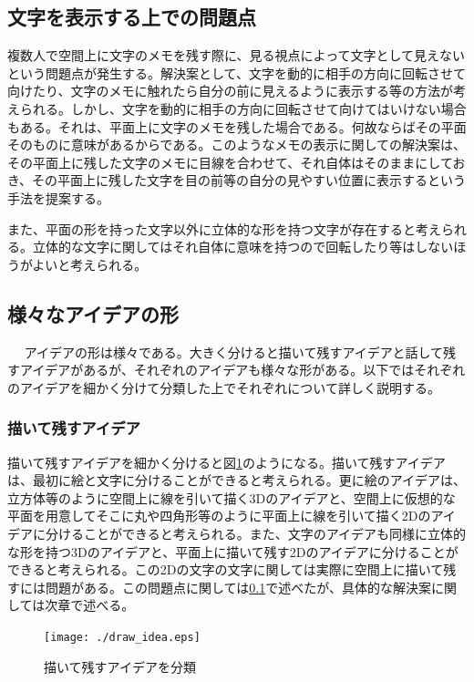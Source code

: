 \documentclass[11pt,a4j, titlepage]{jarticle} %
\begin{document}
\subsection{文字を表示する上での問題点} \label{moji_mondai}
複数人で空間上に文字のメモを残す際に、見る視点によって文字として見えないという問題点が発生する。解決案として、文字を動的に相手の方向に回転させて向けたり、文字のメモに触れたら自分の前に見えるように表示する等の方法が考えられる。しかし、文字を動的に相手の方向に回転させて向けてはいけない場合もある。それは、平面上に文字のメモを残した場合である。何故ならばその平面そのものに意味があるからである。このようなメモの表示に関しての解決案は、その平面上に残した文字のメモに目線を合わせて、それ自体はそのままにしておき、その平面上に残した文字を目の前等の自分の見やすい位置に表示するという手法を提案する。

また、平面の形を持った文字以外に立体的な形を持つ文字が存在すると考えられる。立体的な文字に関してはそれ自体に意味を持つので回転したり等はしないほうがよいと考えられる。

\subsection{様々なアイデアの形}　\label{idea_katachi}
アイデアの形は様々である。大きく分けると描いて残すアイデアと話して残すアイデアがあるが、それぞれのアイデアも様々な形がある。以下ではそれぞれのアイデアを細かく分けて分類した上でそれぞれについて詳しく説明する。

\subsubsection{描いて残すアイデア} \label{draw_idea}
描いて残すアイデアを細かく分けると図\ref{fig:draw_idea}のようになる。描いて残すアイデアは、最初に絵と文字に分けることができると考えられる。更に絵のアイデアは、立方体等のように空間上に線を引いて描く3Dのアイデアと、空間上に仮想的な平面を用意してそこに丸や四角形等のように平面上に線を引いて描く2Dのアイデアに分けることができると考えられる。また、文字のアイデアも同様に立体的な形を持つ3Dのアイデアと、平面上に描いて残す2Dのアイデアに分けることができると考えられる。この2Dの文字の文字に関しては実際に空間上に描いて残すには問題がある。この問題点に関しては\ref{moji_mondai}で述べたが、具体的な解決案に関しては次章で述べる。

\begin{figure}[H]
  \begin{center}
    \texttt{[image: ./draw\_idea.eps]}
    \caption{描いて残すアイデアを分類}
    \label{fig:draw_idea}
  \end{center}
\end{figure}
\end{document}
